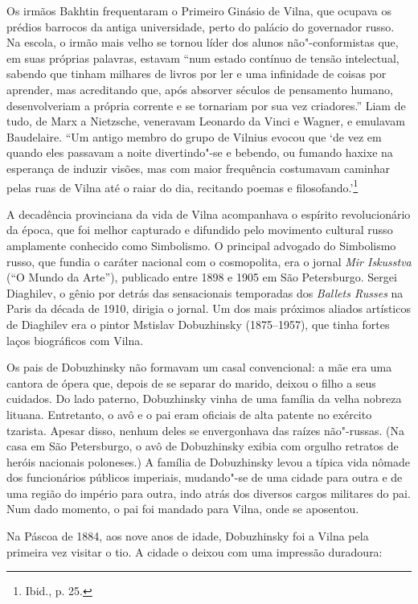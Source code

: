 Os irmãos Bakhtin frequentaram o Primeiro Ginásio de Vilna, que ocupava
os prédios barrocos da antiga universidade, perto do palácio do
governador russo. Na escola, o irmão mais velho se tornou líder dos
alunos não"-conformistas que, em suas próprias palavras, estavam ``num
estado contínuo de tensão intelectual, sabendo que tinham milhares de
livros por ler e uma infinidade de coisas por aprender, mas acreditando
que, após absorver séculos de pensamento humano, desenvolveriam a
própria corrente e se tornariam por sua vez criadores.'' Liam de tudo,
de Marx a Nietzsche, veneravam Leonardo da Vinci e Wagner, e emulavam
Baudelaire. ``Um antigo membro do grupo de Vilnius evocou que `de vez em
quando eles passavam a noite divertindo"-se e bebendo, ou fumando haxixe
na esperança de induzir visões, mas com maior frequência costumavam
caminhar pelas ruas de Vilna até o raiar do dia, recitando poemas e
filosofando.'\footnote{Ibid., p. 25.}

\asterisc

A decadência provinciana da vida de Vilna acompanhava o espírito
revolucionário da época, que foi melhor capturado e difundido pelo
movimento cultural russo amplamente conhecido como Simbolismo. O
principal advogado do Simbolismo russo, que fundia o caráter nacional
com o cosmopolita, era o jornal \textit{Mir Iskusstva} (``O Mundo da
Arte''), publicado entre 1898 e 1905 em São Petersburgo. Sergei
Diaghilev, o gênio por detrás das sensacionais temporadas dos
\textit{Ballets Russes} na Paris da década de 1910, dirigia o jornal. Um
dos mais próximos aliados artísticos de Diaghilev era o pintor Mstislav
Dobuzhinsky (1875--1957), que tinha fortes laços biográficos com Vilna.

Os pais de Dobuzhinsky não formavam um casal convencional: a mãe era uma
cantora de ópera que, depois de se separar do marido, deixou o filho a
seus cuidados. Do lado paterno, Dobuzhinsky vinha de uma família da
velha nobreza lituana. Entretanto, o avô e o pai eram oficiais de alta
patente no exército tzarista. Apesar disso, nenhum deles se envergonhava
das raízes não"-russas. (Na casa em São Petersburgo, o avô de Dobuzhinsky
exibia com orgulho retratos de heróis nacionais poloneses.) A família de
Dobuzhinsky levou a típica vida nômade dos funcionários públicos
imperiais, mudando"-se de uma cidade para outra e de uma região do
império para outra, indo atrás dos diversos cargos militares do pai. Num
dado momento, o pai foi mandado para Vilna, onde se aposentou.

Na Páscoa de 1884, aos nove anos de idade, Dobuzhinsky foi a Vilna pela
primeira vez visitar o tio. A cidade o deixou com uma impressão
duradoura:

